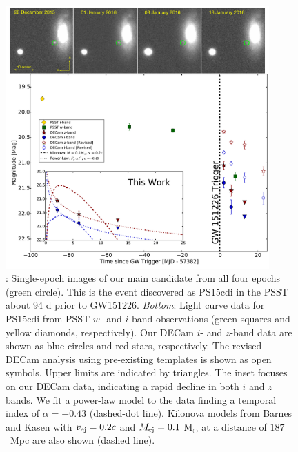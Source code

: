  \begin{figure}[t!]
 \centering
 \includegraphics[width=0.9\textwidth]{./figs/chapter4/fig2.pdf}
 \caption{: Single-epoch images of our main candidate
 from all four epochs (green circle). This is the event discovered as PS15cdi in
 the PSST about 94 d prior to GW151226. {\it Bottom}: Light
 curve data for PS15cdi from PSST $w$- and $i$-band
 observations (green squares and yellow diamonds, respectively).
 Our DECam $i$- and $z$-band data are shown as
 blue circles and red stars, respectively. The revised DECam analysis
 using pre-existing templates is shown as open symbols. Upper
 limits are indicated by triangles. The inset focuses on our
 DECam data, indicating a rapid decline in both $i$ and $z$
 bands.  We fit a power-law model to the data finding a temporal index of
 $\alpha = -0.43$ (dashed-dot line). Kilonova models from Barnes and
 Kasen \citeyearpar{BarnesKasen13} with $v_{\rm ej}=0.2c$ and $M_{\rm ej}=0.1$ M$_\odot$
 at a distance of $187$~Mpc are also shown (dashed line).}
 \label{fig:ch4_PS15cdi}
 \end{figure}

